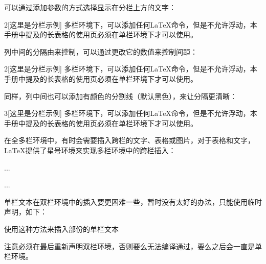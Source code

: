     可以通过添加参数的方式选择显示在分栏上方的文字：
    \begin{texshow}
        \begin{multicols}{2}[这里是分栏示例]
            多栏环境下，可以添加任何\LaTeX{}命令，但是不允许浮动，本手册中提及的长表格的使用页必须在单栏环境下才可以使用。
        \end{multicols}
    \end{texshow}

    列中间的分隔由来控制，可以通过更改它的数值来控制间距：
    \begin{texshow}
        \setlength{\columnsep}{0.4pt}%
        \begin{multicols}{2}[这里是分栏示例]
            多栏环境下，可以添加任何\LaTeX{}命令，但是不允许浮动，本手册中提及的长表格的使用页必须在单栏环境下才可以使用。
        \end{multicols}
    \end{texshow}

    同样，列中间也可以添加有颜色的分割线（默认黑色），来让分隔更清晰：
    \begin{texshow}
        \setlength{\columnseprule}{1pt}
        \renewcommand{\columnseprulecolor}{\color{red}}
        \begin{multicols}{3}[这里是分栏示例]
            多栏环境下，可以添加任何\LaTeX{}命令，但是不允许浮动，本手册中提及的长表格的使用页必须在单栏环境下才可以使用。
        \end{multicols}
    \end{texshow}

    在全多栏环境中，有时会需要插入跨栏的文字、表格或图片，对于表格和文字，\LaTeX{}提供了星号环境来实现多栏环境中的跨栏插入：
    \begin{texcode}
        \begin{figure*}
            ...
        \end{figure*}
        \begin{table*}
            ...
        \end{table*}
    \end{texcode}
    单栏文本在双栏环境中的插入要更困难一些，暂时没有太好的办法，只能使用临时声明，如下：
    \begin{texcode}
        \onecolumn 使用这种方法来插入部份的单栏文本
        \twocolumn 
    \end{texcode}
    注意必须在最后重新声明双栏环境，否则要么无法编译通过，要么之后会一直是单栏环境。
    
